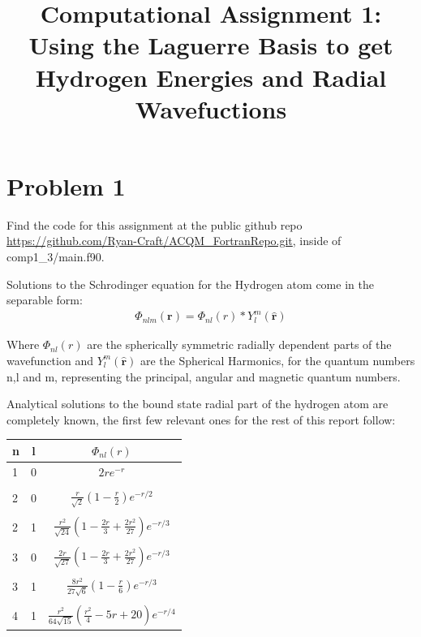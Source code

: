 \documentclass{article}
\renewcommand{\vec}[1]{\mathbf{#1}}
\let\oldhat\hat
\renewcommand{\hat}[1]{\oldhat{\mathbf{#1}}}
\begin{document}
\noindent
	\title{Computational Assignment 1: Using the Laguerre Basis to get Hydrogen Energies and Radial Wavefuctions}
    \maketitle 
    
    \section{Problem 1}
    Find the code for this assignment at the public github repo \url{https://github.com/Ryan-Craft/ACQM_FortranRepo.git}, inside of comp1\_3/main.f90. 
    \label{problem 1}
    
    Solutions to the Schrodinger equation for the Hydrogen atom come in the separable form:
    \begin{gather}
    	\Phi_{nlm}(\vec{r}) =  \Phi_{nl}(r)*Y_{l}^m(\hat{\vec{r}})
    \end{gather}
    
    Where $\Phi_{nl}(r)$ are the spherically symmetric radially dependent parts of the wavefunction and $Y_{l}^m(\hat{\vec{r}})$ are the Spherical Harmonics, for the quantum numbers n,l and m, representing the principal, angular and magnetic quantum numbers. 
    
    Analytical solutions to the bound state radial part of the hydrogen atom are completely known, the first few relevant ones for the rest of this report follow:
    \large
    \begin{center}
    	\begin{tabular}{lcc}\toprule
    		n & l & $\Phi_{nl}(r)$ \\ \bottomrule
    		1 & 0  &   $2re^{-r}$          \\
    		&&\\
    		2 & 0  & $\frac{r}{\sqrt{2}}(1-\frac{r}{2})e^{-r/2} $  \\
    		&&\\
    		2 & 1  & $ \frac{r^2}{\sqrt{24}}(1-\frac{2r}{3} + \frac{2r^2}{27})e^{-r/3}  $  \\
    		&&\\
    		3 & 0  & $\frac{2r}{\sqrt{27}}(1-\frac{2r}{3}+\frac{2r^2}{27})e^{-r/3}$   \\
    		&&\\
    		3 & 1  & $\frac{8r^2}{27\sqrt{6}}(1-\frac{r}{6})e^{-r/3}$ \\ 
    		&&\\
    		4 & 1  & $\frac{r^2}{64\sqrt{15}}(\frac{r^2}{4}-5r+20)e^{-r/4}$ \\ \bottomrule
    	\end{tabular}
    \end{center}
    \normalsize
    
\end{document}
